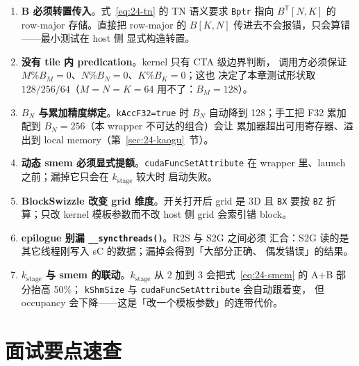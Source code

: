 \begin{enumerate}
  \item \textbf{B 必须转置传入}。式~\eqref{eq:24-tn} 的 TN 语义要求
        \texttt{Bptr} 指向 $B^{\mathsf T}[N,K]$ 的 row-major 存储。直接把
        row-major 的 $B[K,N]$ 传进去不会报错，只会算错——最小测试在 host 侧
        显式构造转置。
  \item \textbf{没有 tile 内 predication}。kernel 只有 CTA 级边界判断，
        调用方必须保证 $M \% B_M = 0$、$N \% B_N = 0$、$K \% B_K = 0$；这也
        决定了本章测试形状取 $128/256/64$（$M=N=K=64$ 用不了：$B_M=128$）。
  \item \textbf{$B_N$ 与累加精度绑定}。\texttt{k\allowbreak{}Acc\allowbreak{}F32=\allowbreak{}true} 时 $B_N$ 自动降到
        128；手工把 F32 累加配到 $B_N=256$（本 wrapper 不可达的组合）会让
        累加器超出可用寄存器、溢出到 local memory（第~\ref{sec:24-kaogu}~节）。
  \item \textbf{动态 smem 必须显式提额}。\texttt{cuda\allowbreak{}Func\allowbreak{}Set\allowbreak{}Attribute} 在
        wrapper 里、launch 之前；漏掉它只会在 $k_{\mathrm{stage}}$ 较大时
        启动失败。
  \item \textbf{BlockSwizzle 改变 grid 维度}。开关打开后 grid 是 3D 且
        \texttt{BX} 要按 \texttt{BZ} 折算；只改 kernel 模板参数而不改 host
        侧 grid 会索引错 block。
  \item \textbf{epilogue 别漏 \texttt{\_\allowbreak{}\_\allowbreak{}syncthreads\allowbreak{}()}}。R2S 与 S2G 之间必须
        汇合：S2G 读的是其它线程刚写入 sC 的数据；漏掉会得到「大部分正确、
        偶发错误」的结果。
  \item \textbf{$k_{\mathrm{stage}}$ 与 smem 的联动}。$k_{\mathrm{stage}}$ 从 2
        加到 3 会把式~\eqref{eq:24-smem} 的 A$+$B 部分抬高 50\%；
        \texttt{kShmSize} 与 \texttt{cuda\allowbreak{}Func\allowbreak{}Set\allowbreak{}Attribute} 会自动跟着变，
        但 occupancy 会下降——这是「改一个模板参数」的连带代价。
\end{enumerate}

\section{面试要点速查}

